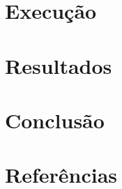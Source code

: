 \documentclass[
	12pt,				%
	openright,			%
	oneside,			%
	a4paper,			%
	english,			%
	french,				%
	spanish,			%
	brazil				%
	]{abntex2}
\begin{document}
\section{Execução}

\section{Resultados}

\section{Conclusão}
\section{Referências}






\postextual


%
%
\end{document}

